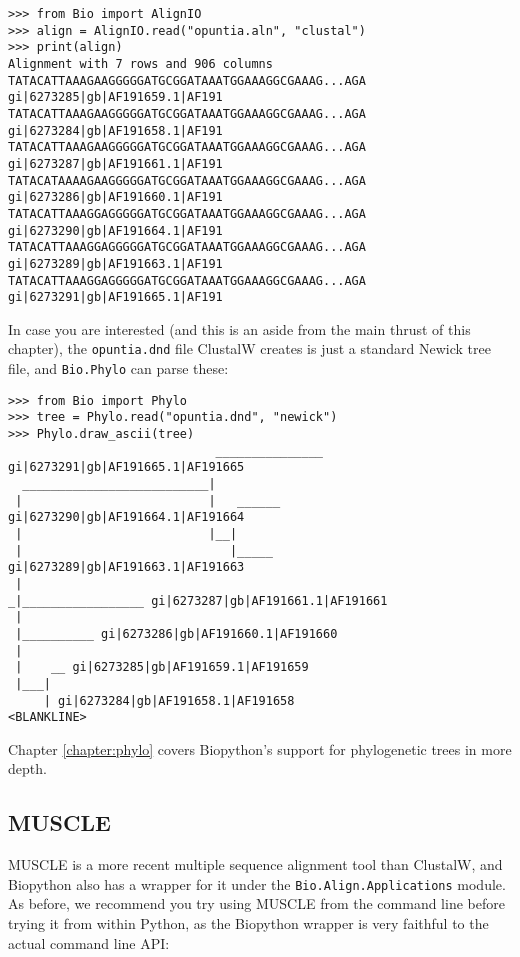 \begin{verbatim}
>>> from Bio import AlignIO
>>> align = AlignIO.read("opuntia.aln", "clustal")
>>> print(align)
Alignment with 7 rows and 906 columns
TATACATTAAAGAAGGGGGATGCGGATAAATGGAAAGGCGAAAG...AGA gi|6273285|gb|AF191659.1|AF191
TATACATTAAAGAAGGGGGATGCGGATAAATGGAAAGGCGAAAG...AGA gi|6273284|gb|AF191658.1|AF191
TATACATTAAAGAAGGGGGATGCGGATAAATGGAAAGGCGAAAG...AGA gi|6273287|gb|AF191661.1|AF191
TATACATAAAAGAAGGGGGATGCGGATAAATGGAAAGGCGAAAG...AGA gi|6273286|gb|AF191660.1|AF191
TATACATTAAAGGAGGGGGATGCGGATAAATGGAAAGGCGAAAG...AGA gi|6273290|gb|AF191664.1|AF191
TATACATTAAAGGAGGGGGATGCGGATAAATGGAAAGGCGAAAG...AGA gi|6273289|gb|AF191663.1|AF191
TATACATTAAAGGAGGGGGATGCGGATAAATGGAAAGGCGAAAG...AGA gi|6273291|gb|AF191665.1|AF191
\end{verbatim}

In case you are interested (and this is an aside from the main thrust of this
chapter), the \texttt{opuntia.dnd} file ClustalW creates is just a standard
Newick tree file, and \verb|Bio.Phylo| can parse these:


\begin{verbatim}
>>> from Bio import Phylo
>>> tree = Phylo.read("opuntia.dnd", "newick")
>>> Phylo.draw_ascii(tree)
                             _______________ gi|6273291|gb|AF191665.1|AF191665
  __________________________|
 |                          |   ______ gi|6273290|gb|AF191664.1|AF191664
 |                          |__|
 |                             |_____ gi|6273289|gb|AF191663.1|AF191663
 |
_|_________________ gi|6273287|gb|AF191661.1|AF191661
 |
 |__________ gi|6273286|gb|AF191660.1|AF191660
 |
 |    __ gi|6273285|gb|AF191659.1|AF191659
 |___|
     | gi|6273284|gb|AF191658.1|AF191658
<BLANKLINE>
\end{verbatim}

\noindent Chapter \ref{chapter:phylo} covers Biopython's support for phylogenetic trees in more
depth.

\subsection{MUSCLE}
MUSCLE is a more recent multiple sequence alignment tool than ClustalW, and
Biopython also has a wrapper for it under the \verb|Bio.Align.Applications|
module. As before, we recommend you try using MUSCLE from the command line before
trying it from within Python, as the Biopython wrapper is very faithful to the
actual command line API:

